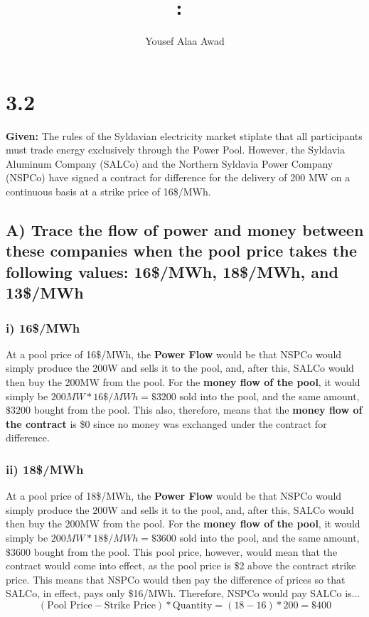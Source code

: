 \documentclass{article}
\title{
    \vspace{2in}
    \textmd{\textbf{\hmwkClass:\ \hmwkTitle}}\\
    \normalsize\vspace{0.1in}
    \vspace{3in}
}
\author{Yousef Alaa Awad}
\begin{document}
\maketitle
\pagebreak

\section{3.2}
\textbf{Given:} The rules of the Syldavian electricity market stiplate that all participants must trade energy exclusively through the Power Pool. However, the Syldavia Aluminum Company (SALCo) and the Northern Syldavia Power Company (NSPCo) have signed a contract for difference for the delivery of 200 MW on a continuous basis at a strike price of 16\$/MWh.

\subsection{A) Trace the flow of power and money between these companies when the pool price takes the following values: 16\$/MWh, 18\$/MWh, and 13\$/MWh}

\subsubsection{i) 16\$/MWh}
At a pool price of 16\$/MWh, the \textbf{Power Flow} would be that NSPCo would simply produce the 200W and sells it to the pool, and, after this, SALCo would then buy the 200MW from the pool. For the \textbf{money flow of the pool}, it would simply be $200MW*16\$/MWh = \$3200$ sold into the pool, and the same amount, $\$3200$ bought from the pool. This also, therefore, means that the \textbf{money flow of the contract} is \$0 since no money was exchanged under the contract for difference.

\subsubsection{ii) 18\$/MWh}
At a pool price of 18\$/MWh, the \textbf{Power Flow} would be that NSPCo would simply produce the 200W and sells it to the pool, and, after this, SALCo would then buy the 200MW from the pool. For the \textbf{money flow of the pool}, it would simply be $200MW*18\$/MWh = \$3600$ sold into the pool, and the same amount, $\$3600$ bought from the pool. This pool price, however, would mean that the contract would come into effect, as the pool price is \$2 above the contract strike price. This means that NSPCo would then pay the difference of prices so that SALCo, in effect, pays only \$16/MWh. Therefore, NSPCo would pay SALCo is... $$ (\text{Pool Price} - \text{Strike Price})*\text{Quantity} = (18 - 16)*200 = \$400 $$
\end{document}
